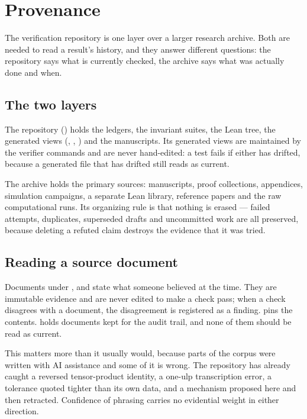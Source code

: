 \section{Provenance}
\label{app:provenance}

The verification repository is one layer over a larger research archive.
Both are needed to read a result's history, and they answer different
questions: the repository says what is currently checked, the archive
says what was actually done and when.

\subsection{The two layers}

The repository () holds the
ledgers, the invariant suites, the Lean tree, the generated views
(, , ) and the
manuscripts. Its generated views are maintained by the verifier commands
and are never hand-edited: a test fails if either has drifted, because a
generated file that has drifted still reads as current.

The archive holds the primary sources: manuscripts, proof collections,
appendices, simulation campaigns, a separate Lean library, reference
papers and the raw computational runs. Its organizing rule is that
nothing is erased --- failed attempts, duplicates, superseded drafts and
uncommitted work are all preserved, because deleting a refuted claim
destroys the evidence that it was tried.

\subsection{Reading a source document}

Documents under ,  and
 state what someone believed at the time. They are
immutable evidence and are never edited to make a check pass; when a
check disagrees with a document, the disagreement is registered as a
finding.  pins the contents.
 holds documents kept for the audit trail,
and none of them should be read as current.

This matters more than it usually would, because parts of the corpus
were written with AI assistance and some of it is wrong. The repository
has already caught a reversed tensor-product identity, a one-ulp
transcription error, a tolerance quoted tighter than its own data, and a
mechanism proposed here and then retracted. Confidence of phrasing
carries no evidential weight in either direction.


